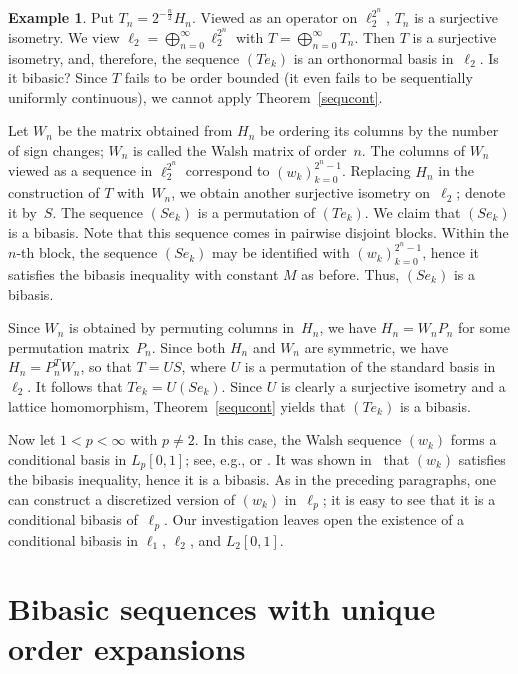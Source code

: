 \documentclass[12pt]{amsart}
\theoremstyle{plain}
\theoremstyle{definition}
\newtheorem{example}[theorem]{Example}
\begin{document}
\begin{example}
  Put $T_n=2^{-\frac{n}{2}}H_n$. Viewed as an operator on
  $\ell_2^{2^n}$, $T_n$ is a surjective isometry. We view
  $\ell_2=\bigoplus_{n=0}^\infty\ell_2^{2^n}$ with
  $T=\bigoplus_{n=0}^\infty T_n$.  Then $T$ is a surjective isometry,
  and, therefore, the sequence $(Te_k)$ is an orthonormal basis
  in~$\ell_2$. Is it bibasic? Since $T$ fails to be order bounded (it
  even fails to be sequentially uniformly continuous), we cannot apply
  Theorem~\ref{sequcont}.

  Let $W_n$ be the matrix obtained from $H_n$ be ordering its columns
  by the number of sign changes; $W_n$ is called the Walsh matrix of
  order~$n$. The columns of $W_n$ viewed as a sequence in
  $\ell_2^{2^n}$ correspond to $(w_k)_{k=0}^{2^n-1}$. Replacing $H_n$
  in the construction of $T$ with~$W_n$, we obtain another surjective
  isometry on~$\ell_2$; denote it by~$S$. The sequence $(Se_k)$ is a
  permutation of $(Te_k)$. We claim that $(Se_k)$ is a bibasis. Note
  that this sequence comes in pairwise disjoint blocks. Within the
  $n$-th block, the sequence $(Se_k)$ may be identified with
  $(w_k)_{k=0}^{2^n-1}$, hence it satisfies the bibasis inequality
  with constant $M$ as before. Thus, $(Se_k)$ is a bibasis.

  Since $W_n$ is obtained by permuting columns in~$H_n$, we have
  $H_n=W_nP_n$ for some permutation matrix~$P_n$. Since both $H_n$ and
  $W_n$ are symmetric, we have $H_n=P_n^TW_n$, so that $T=US$, where
  $U$ is a permutation of the standard basis in~$\ell_2$. It follows
  that $Te_k=U(Se_k)$. Since $U$ is clearly a surjective isometry and
  a lattice homomorphism, Theorem~\ref{sequcont} yields that
  $(Te_k)$ is a bibasis.

  Now let $1< p<\infty$ with $p\ne 2$. In this case, the Walsh
  sequence $(w_k)$ forms a conditional basis in $L_p[0,1]$; see, e.g.,
  \cite[p.~6]{Popov:13} or \cite[pp. 23--24]{Muller:05}. It was shown
  in~\cite{Sjolin:69} that $(w_k)$ satisfies the bibasis inequality,
  hence it is a bibasis. As in the preceding paragraphs, one can
  construct a discretized version of $(w_k)$ in~$\ell_p$; it is easy
  to see that it is a conditional bibasis of~$\ell_p$. Our
  investigation leaves open the existence of a conditional bibasis in
  $\ell_1$, $\ell_2$, and $L_2[0,1]$.
\end{example}



\section{Bibasic sequences with unique order expansions}
\end{document}
